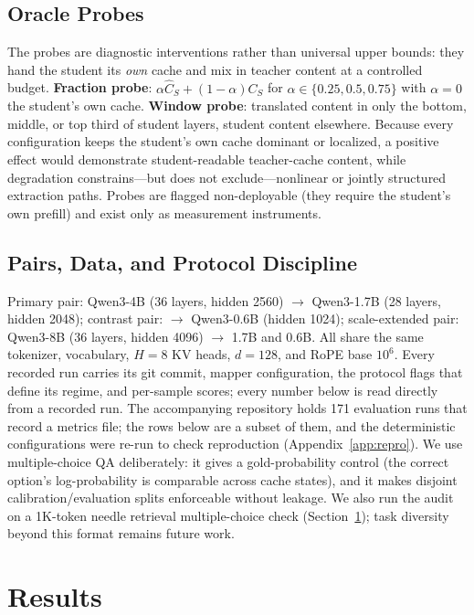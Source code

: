 \documentclass{article} %
\begin{document}
\subsection{Oracle Probes}
The probes are diagnostic interventions rather than universal upper bounds:
they hand the student its \emph{own} cache and mix in teacher content at a
controlled budget.
\textbf{Fraction probe}: $\alpha\widehat{C}_S + (1-\alpha)C_S$ for
$\alpha \in \{0.25, 0.5, 0.75\}$ with $\alpha{=}0$ the student's own cache.
\textbf{Window probe}: translated content in only the bottom, middle, or top
third of student layers, student content elsewhere. Because every
configuration keeps the student's own cache dominant or localized, a positive
effect would demonstrate student-readable teacher-cache content, while
degradation constrains---but does not exclude---nonlinear or jointly
structured extraction paths. Probes are
flagged non-deployable (they require the student's own prefill) and exist
only as measurement instruments.

\subsection{Pairs, Data, and Protocol Discipline}
Primary pair: Qwen3-4B (36 layers, hidden 2560) $\to$ Qwen3-1.7B (28 layers,
hidden 2048); contrast pair: $\to$ Qwen3-0.6B (hidden 1024); scale-extended
pair: Qwen3-8B (36 layers, hidden 4096) $\to$ 1.7B and 0.6B. All share the
same tokenizer, vocabulary, $H{=}8$ KV heads, $d{=}128$, and RoPE base
$10^6$. Every recorded run carries its git commit, mapper configuration, the
protocol flags that define its regime, and per-sample scores; every number
below is read directly from a recorded run. The accompanying repository holds
171 evaluation runs that record a metrics file; the rows below are a subset of
them, and the deterministic configurations were re-run to check reproduction
(Appendix~\ref{app:repro}).
We use multiple-choice QA deliberately: it gives a gold-probability control
(the correct option's log-probability is comparable across cache states),
and it makes disjoint calibration/evaluation splits enforceable without
leakage. We also run the audit on a 1K-token needle retrieval
multiple-choice check (Section~\ref{sec:results}); task diversity beyond this
format remains future work.

\section{Results}
\label{sec:results}
\end{document}
